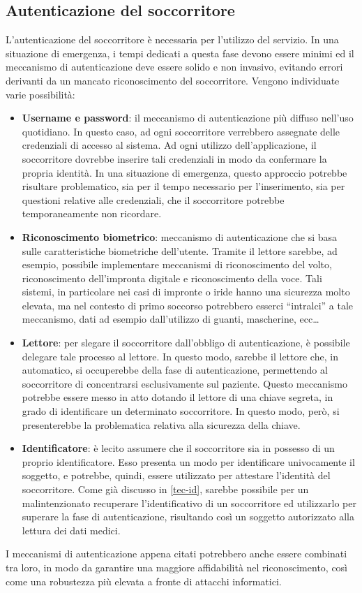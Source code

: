 \documentclass[a4paper,12pt]{report}
\begin{document}
\subsection{Autenticazione del soccorritore} \label{rescuer_auth}
L'autenticazione del soccorritore è necessaria per l'utilizzo del servizio. In una situazione di emergenza, i tempi dedicati a questa fase devono essere minimi ed il meccanismo di autenticazione deve essere solido e non invasivo, evitando errori derivanti da un mancato riconoscimento del soccorritore. Vengono individuate varie possibilità:
\begin{itemize}
	\item \textbf{Username e password}: il meccanismo di autenticazione più diffuso nell'uso quotidiano. In questo caso, ad ogni soccorritore verrebbero assegnate delle credenziali di accesso al sistema. Ad ogni utilizzo dell'applicazione, il soccorritore dovrebbe inserire tali credenziali in modo da confermare la propria identità. In una situazione di emergenza, questo approccio potrebbe risultare problematico, sia per il tempo necessario per l'inserimento, sia per questioni relative alle credenziali, che il soccorritore potrebbe temporaneamente non ricordare.
	\item \textbf{Riconoscimento biometrico}: meccanismo di autenticazione che si basa sulle caratteristiche biometriche dell'utente. Tramite il lettore sarebbe, ad esempio, possibile implementare meccanismi di riconoscimento del volto, riconoscimento dell'impronta digitale e riconoscimento della voce. Tali sistemi, in particolare nei casi di impronte o iride hanno una sicurezza molto elevata, ma nel contesto di primo soccorso potrebbero esserci ``intralci'' a tale meccanismo, dati ad esempio dall'utilizzo di guanti, mascherine, ecc\dots
	\item \textbf{Lettore}: per slegare il soccorritore dall'obbligo di autenticazione, è possibile delegare tale processo al lettore. In questo modo, sarebbe il lettore che, in automatico, si occuperebbe della fase di autenticazione, permettendo al soccorritore di concentrarsi esclusivamente sul paziente. Questo meccanismo potrebbe essere messo in atto dotando il lettore di una chiave segreta, in grado di identificare un determinato soccorritore. In questo modo, però, si presenterebbe la problematica relativa alla sicurezza della chiave.
	\item \textbf{Identificatore}: è lecito assumere che il soccorritore sia in possesso di un proprio identificatore. Esso presenta un modo per identificare univocamente il soggetto, e potrebbe, quindi, essere utilizzato per attestare l'identità del soccorritore. Come già discusso in \autoref{tec-id}, sarebbe possibile per un malintenzionato recuperare l'identificativo di un soccorritore ed utilizzarlo per superare la fase di autenticazione, risultando così un soggetto autorizzato alla lettura dei dati medici.
\end{itemize}
I meccanismi di autenticazione appena citati potrebbero anche essere combinati tra loro, in modo da garantire una maggiore affidabilità nel riconoscimento, così come una robustezza più elevata a fronte di attacchi informatici.
\end{document}
